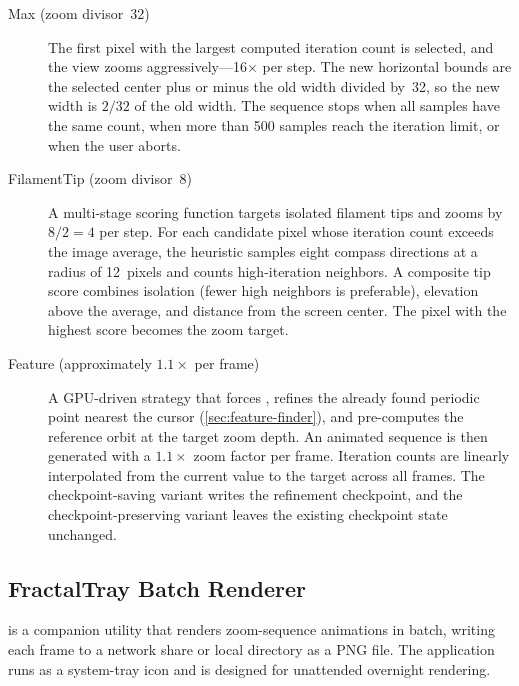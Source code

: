 \begin{description}
  \item[Max (zoom divisor~32)]
    The first pixel with the largest computed iteration count is selected,
    and the view zooms aggressively---16$\times$ per step. The new horizontal
    bounds are the selected center plus or minus the old width divided by~32,
    so the new width is $2/32$ of the old width. The sequence stops when all
    samples have the same count, when more than 500 samples reach the iteration
    limit, or when the user aborts.

  \item[FilamentTip (zoom divisor~8)]
    A multi-stage scoring function targets isolated filament tips and zooms
    by $8/2=4$ per step. For
    each candidate pixel whose iteration count exceeds the image
    average, the heuristic samples eight compass directions at a radius
    of 12~pixels and counts high-iteration neighbors.  A composite
    tip score combines isolation (fewer high neighbors is preferable),
    elevation above the average, and distance from the screen center.
    The pixel with the highest score becomes the zoom target.

  \item[Feature (approximately $1.1\times$ per frame)]
    A GPU-driven strategy that forces ,
    refines the already found periodic point nearest the cursor
    (\cref{sec:feature-finder}), and pre-computes the reference orbit
    at the target zoom depth.  An animated sequence is then generated
    with a $1.1\times$ zoom factor per frame.  Iteration counts are
    linearly interpolated from the current value to the target across
    all frames.  The checkpoint-saving variant writes the refinement
    checkpoint, and the checkpoint-preserving variant leaves the existing
    checkpoint state unchanged.
\end{description}

\subsection{FractalTray Batch Renderer}
\label{subsec:fractaltray}

 is a companion utility that renders zoom-sequence
animations in batch, writing each frame to a network share or local
directory as a PNG file. The application runs as a system-tray icon
and is designed for unattended overnight rendering.

